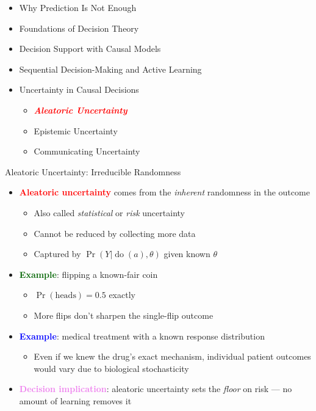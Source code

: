 \documentclass[
  10pt,
  ignorenonframetext,
]{beamer}
\providecommand{\tightlist}{%
  \setlength{\itemsep}{0pt}\setlength{\parskip}{0pt}}
\begin{document}
\begin{frame}{}
\label{section-17}
\begin{itemize}
\tightlist
\item
  Why Prediction Is Not Enough
\item
  Foundations of Decision Theory
\item
  Decision Support with Causal Models
\item
  Sequential Decision-Making and Active Learning
\item
  Uncertainty in Causal Decisions

  \begin{itemize}
  \tightlist
  \item
    \emph{\textbf{\textcolor{red}{Aleatoric Uncertainty}}}
  \item
    Epistemic Uncertainty
  \item
    Communicating Uncertainty
  \end{itemize}
\end{itemize}
\end{frame}

\begin{frame}{Aleatoric Uncertainty: Irreducible Randomness}
\label{aleatoric-uncertainty-irreducible-randomness}
\begin{itemize}
\tightlist
\item
  \textbf{\textcolor{red}{Aleatoric uncertainty}} comes from the
  \emph{inherent} randomness in the outcome

  \begin{itemize}
  \tightlist
  \item
    Also called \emph{statistical} or \emph{risk} uncertainty
  \item
    Cannot be reduced by collecting more data
  \item
    Captured by \(\Pr(Y | \operatorname{do}(a), \theta)\) given known
    \(\theta\)
  \end{itemize}
\item
  \textbf{\textcolor{darkgreen}{Example}}: flipping a known-fair coin

  \begin{itemize}
  \tightlist
  \item
    \(\Pr(\text{heads}) = 0.5\) exactly
  \item
    More flips don't sharpen the single-flip outcome
  \end{itemize}
\item
  \textbf{\textcolor{blue}{Example}}: medical treatment with a known
  response distribution

  \begin{itemize}
  \tightlist
  \item
    Even if we knew the drug's exact mechanism, individual patient
    outcomes would vary due to biological stochasticity
  \end{itemize}
\item
  \textbf{\textcolor{violet}{Decision implication}}: aleatoric
  uncertainty sets the \emph{floor} on risk --- no amount of learning
  removes it
\end{itemize}
\end{frame}
\end{document}

